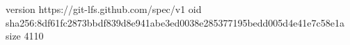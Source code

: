 version https://git-lfs.github.com/spec/v1
oid sha256:8df61fc2873bbdf839d8e941abe3ed0038e285377195bedd005d4e41e7c58e1a
size 4110
